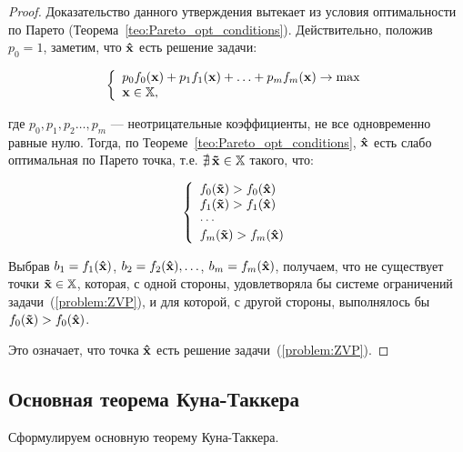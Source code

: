 \begin{proof}
Доказательство данного утверждения вытекает из условия оптимальности
по Парето (Теорема~\ref{teo:Pareto_opt_conditions}). Действительно,
положив $p_0=1$, заметим, что $\mathbf{\hat x}$ есть решение задачи:

\[
\left\{ \begin{array}{l}
 p_0 f_0(\mathbf{x}) + p_1 f_1(\mathbf{x})+ \ldots + p_m f_m(\mathbf{x}) \to \max  \\
 \mathbf{x} \in \mathbb{X}, \\
 \end{array} \right.
\]

\noindent где $p_0, p_1, p_2 \ldots, p_m$ --- неотрицательные
коэффициенты, не все одновременно равные нулю. Тогда, по
Теореме~\ref{teo:Pareto_opt_conditions}, $\mathbf{\hat x}$ есть слабо
оптимальная по Парето точка, т.е. $\nexists\, \mathbf{\tilde x} \in
\mathbb{X}$ такого, что:

\[
\left\{ \begin{array}{l}
 f_0(\mathbf{\tilde x}) > f_0(\mathbf{\hat x})\\
 f_1(\mathbf{\tilde x}) > f_1(\mathbf{\hat x})\\
  \cdots  \\
 f_m(\mathbf{\tilde x}) > f_m(\mathbf{\hat x}) \\
 \end{array} \right.
\]

Выбрав $b_1=f_1(\mathbf{\hat x})$, $b_2=f_2(\mathbf{\hat x}), \ldots$,
$b_m=f_m(\mathbf{\hat x})$, получаем, что не существует точки
$\mathbf{\tilde x} \in \mathbb{X}$, которая, с одной стороны, удовлетворяла
бы системе ограничений задачи~(\ref{problem:ZVP}), и для которой, с
другой стороны, выполнялось бы $f_0(\mathbf{\tilde x}) > f_0(\mathbf{\hat
x})$.

Это означает, что точка $\mathbf{\hat x}$ есть решение
задачи~(\ref{problem:ZVP}).

\end{proof}


\subsection{Основная теорема Куна-Таккера}


Сформулируем основную теорему Куна-Таккера.

